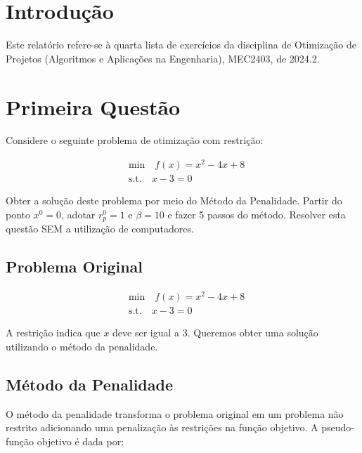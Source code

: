 \documentclass[a4paper, 12pt]{article}
\begin{document}
\newpage


\newpage

\listoffigures
\thispagestyle{empty}

\newpage

\newpage

\thispagestyle{empty}

\newpage

\section{Introdução}
Este relatório refere-se à quarta lista de exercícios da disciplina de Otimização de Projetos (Algoritmos e Aplicações na Engenharia), MEC2403, de 2024.2.

\section{Primeira Questão}

Considere o seguinte problema de otimização com restrição:

\begin{align*}
    & \text{min} \quad f(x) = x^2 - 4x + 8 \\
    & \text{s.t.} \quad x - 3 = 0
\end{align*}

Obter a solução deste problema por meio do Método da Penalidade. Partir do ponto $x^0 = 0$, adotar $r_p^0 = 1$ e $\beta = 10$ e fazer 5 passos do método. Resolver esta questão SEM a utilização de computadores.

\subsection{Problema Original}

\begin{align*}
    & \text{min} \quad f(x) = x^2 - 4x + 8 \\
    & \text{s.t.} \quad x - 3 = 0
\end{align*}

A restrição indica que $x$ deve ser igual a 3. Queremos obter uma solução utilizando o método da penalidade.

\subsection{Método da Penalidade}
O método da penalidade transforma o problema original em um problema não restrito adicionando uma penalização às restrições na função objetivo. A pseudo-função objetivo é dada por:
\end{document}
